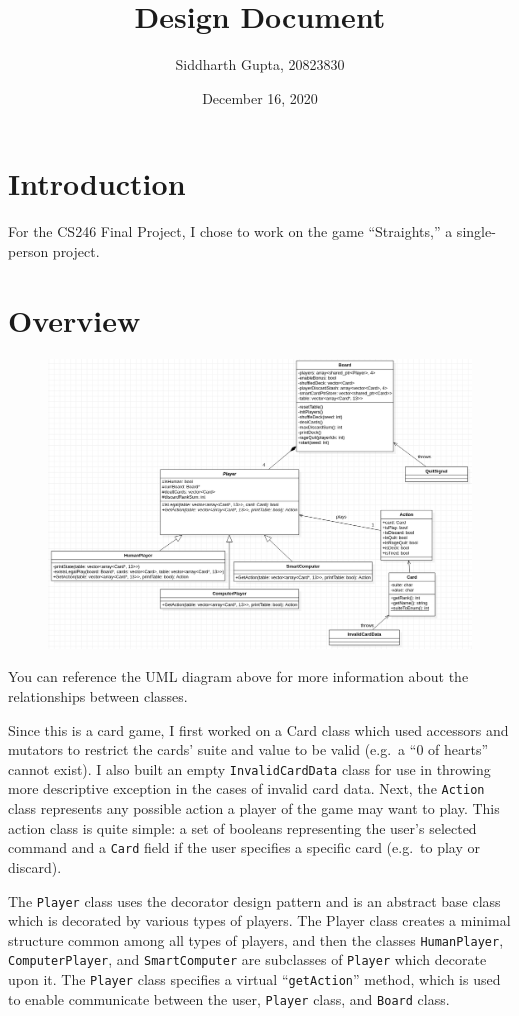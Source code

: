 \documentclass[12pt]{article}
\title{\vspace{-2cm}Design Document}
\author{Siddharth Gupta, 20823830}
\date{December 16, 2020}
\begin{document}
	\maketitle
	\section{Introduction}
		For the CS246 Final Project, I chose to work on the game ``Straights,'' a single-person project.
	\section{Overview}
		\begin{figure}[H]
			\includegraphics[width=\textwidth]{../UML/uml-final.png}
		\end{figure}
		You can reference the UML diagram above for more information about the relationships between classes.

		Since this is a card game, I first worked on a Card class which used accessors and mutators to restrict the cards' suite and value to be valid (e.g.\ a ``0 of hearts'' cannot exist). I also built an empty \texttt{InvalidCardData} class for use in throwing more descriptive exception in the cases of invalid card data.
		Next, the \texttt{Action} class represents any possible action a player of the game may want to play. This action class is quite simple: a set of booleans representing the user's selected command and a \texttt{Card} field if the user specifies a specific card (e.g.\ to play or discard).

		The \texttt{Player} class uses the decorator design pattern and is an abstract base class which is decorated by various types of players. The Player class creates a minimal structure common among all types of players, and then the classes \texttt{HumanPlayer}, \texttt{ComputerPlayer}, and \texttt{SmartComputer} are subclasses of \texttt{Player} which decorate upon it. The \texttt{Player} class specifies a virtual ``\texttt{getAction}'' method, which is used to enable communicate between the user, \texttt{Player} class, and \texttt{Board} class.
\end{document}

